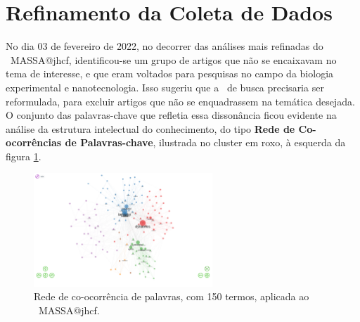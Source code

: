 

\section{Refinamento da Coleta de Dados}

No dia 03 de fevereiro de 2022, no decorrer das análises mais refinadas do \dataset\ MASSA@jhcf, identificou-se um grupo de artigos que não se encaixavam no tema de interesse, e que eram voltados para pesquisas no campo da biologia experimental e nanotecnologia. Isso sugeriu que a \query\  de busca precisaria ser reformulada, para excluir artigos que não se enquadrassem na temática desejada.
O conjunto das palavras-chave que refletia essa dissonância ficou evidente na análise da estrutura intelectual do conhecimento, do tipo \textbf{Rede de Co-ocorrências de Palavras-chave}, ilustrada no cluster em roxo, à esquerda da figura \ref{fig:MASSA@jhcf:redecoocorr-150-termos}.

\begin{figure}[htp]
    \centering
    \includegraphics[clip=true,trim={9cm 0cm 7cm 0cm },width=0.6\textwidth]{experiments/jhcf/PesqBibliogr/SimulacaoMultiagente/WoS-20210803/classico-mais-citacoes/Structure-Informetric/Conceptual/Co-occurrence Network-Keywords-Plus-150-termos.png}
    \caption{Rede de co-ocorrência de palavras, com 150 termos, aplicada ao \dataset\   MASSA@jhcf.}
    \label{fig:MASSA@jhcf:redecoocorr-150-termos}
\end{figure}

